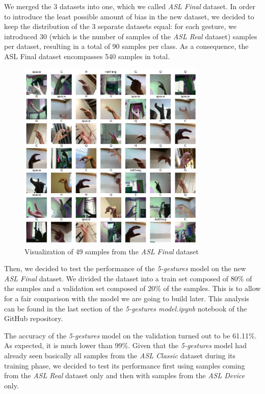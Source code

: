 \documentclass{Configuration_Files/PoliMi3i_thesis}
\begin{document}
We merged the 3 datasets into one, which we called \textit{ASL Final} dataset. In order to introduce the least possible amount of bias in the new dataset, we decided to keep the distribution of the 3 separate datasets equal: for each gesture, we introduced 30 (which is the number of samples of the \textit{ASL Real} dataset) samples per dataset, resulting in a total of 90 samples per class. 
As a consequence, the ASL Final dataset encompasses 540 samples in total.
\begin{figure}[H]
    \centering
    \includegraphics[width=0.8\textwidth]{Figures/asl_final_images.png}
    \caption{Visualization of 49 samples from the \textit{ASL Final} dataset}
    \label{fig:asl_final}
\end{figure}

Then, we decided to test the performance of the \textit{5-gestures} model on the new \textit{ASL Final} dataset. We divided the dataset into a train set composed of 80\% of the samples and a validation set composed of 20\% of the samples. This is to allow for a fair comparison with the model we are going to build later. This analysis can be found in the last section of the\textit{ 5-gestures model.ipynb} notebook of the GitHub repository. 

The accuracy of the \textit{5-gestures} model on the validation turned out to be 61.11\%. As expected, it is much lower than 99\%. Given that the \textit{5-gestures} model had already seen basically all samples from the \textit{ASL Classic} dataset during its training phase, we decided to test its performance first using samples coming from the \textit{ASL Real} dataset only and then with samples from the \textit{ASL Device} only. 
\end{document}
